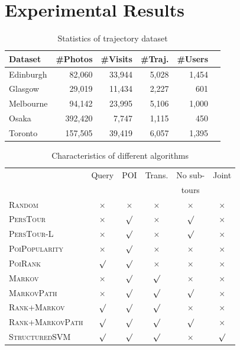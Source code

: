 \section{Experimental Results}
\label{sec:experiment}

\begin{table}
\caption{Statistics of trajectory dataset}
\label{tab:data}
\centering\small
\begin{tabular}{lrrrrr} \hline
\textbf{Dataset} & \textbf{\#Photos} & \textbf{\#Visits} & \textbf{\#Traj.} & \textbf{\#Users} \\ \hline
Edinburgh & 82,060 & 33,944 & 5,028 & 1,454 \\
Glasgow & 29,019 & 11,434 & 2,227 & 601 \\
Melbourne & 94,142 & 23,995 & 5,106 & 1,000 \\
Osaka & 392,420 & 7,747 & 1,115 & 450 \\
Toronto & 157,505 & 39,419 & 6,057 & 1,395 \\
\hline
\end{tabular}
\end{table}


\begin{table}
\caption{Characteristics of different algorithms}
\label{tab:algsummary}
\centering\small
\setlength{\tabcolsep}{3pt} %
\begin{tabular}{l|*{5}{c}} \hline
                                  & Query    & POI      & Trans. & No sub- & Joint        \\ 
                                  &          &          &        & tours   &         \\ \hline
\textsc{Random}                   & $\times$ & $\times$ & $\times$   & $\times$     & $\times$ \\
\textsc{PersTour}\cite{ijcai15}   & $\times$ & $\surd$  & $\times$   & $\surd$      & $\times$ \\
\textsc{PersTour-L}               & $\times$ & $\surd$  & $\times$   & $\surd$      & $\times$ \\
\textsc{PoiPopularity}            & $\times$ & $\surd$  & $\times$   & $\times$     & $\times$ \\
\textsc{PoiRank}                  & $\surd$  & $\surd$  & $\times$   & $\times$     & $\times$ \\
\textsc{Markov}                   & $\times$ & $\surd$  & $\surd$    & $\times$     & $\times$ \\
\textsc{MarkovPath}               & $\times$ & $\surd$  & $\surd$    & $\surd$      & $\times$ \\
\textsc{Rank}+\textsc{Markov}     & $\surd$  & $\surd$  & $\surd$    & $\times$     & $\times$ \\
\textsc{Rank}+\textsc{MarkovPath} & $\surd$  & $\surd$  & $\surd$    & $\surd$      & $\times$ \\
\textsc{StructuredSVM}            & $\surd$  & $\surd$  & $\surd$    & $\times$     & $\surd$  \\ \hline
\end{tabular}
\end{table}


